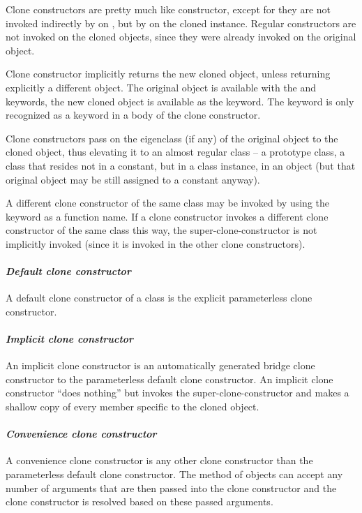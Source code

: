 Clone constructors are pretty much like constructor, except for they are not invoked indirectly by  on , but by  on the cloned instance. Regular constructors are not invoked on the cloned objects, since they were already invoked on the original object. 

Clone constructor implicitly returns the new cloned object, unless returning explicitly a different object. The original object is available with the  and  keywords, the new cloned object is available as the  keyword. The  keyword is only recognized as a keyword in a body of the clone constructor. 

Clone constructors pass on the eigenclass (if any) of the original object to the cloned object, thus elevating it to an almost regular class -- a prototype class, a class that resides not in a constant, but in a class instance, in an object (but that original object may be still assigned to a constant anyway). 

A different clone constructor of the same class may be invoked by using the  keyword as a function name. If a clone constructor invokes a different clone constructor of the same class this way, the super-clone-constructor is not implicitly invoked (since it is invoked in the other clone constructors). 

\paragraph{\em Default clone constructor}
A default clone constructor of a class is the explicit parameterless clone constructor. 

\paragraph{\em Implicit clone constructor}
An implicit clone constructor is an automatically generated bridge clone constructor to the parameterless default clone constructor. An implicit clone constructor ``does nothing'' but invokes the super-clone-constructor and makes a shallow copy of every member specific to the cloned object. 

\paragraph{\em Convenience clone constructor}
A convenience clone constructor is any other clone constructor than the parameterless default clone constructor. The  method of objects can accept any number of arguments that are then passed into the clone constructor and the clone constructor is resolved based on these passed arguments. 


